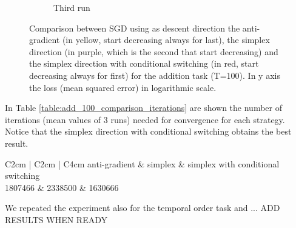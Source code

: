 \begin{figure}
\begin{subfigure}{1.\textwidth}
		\caption{Third run}
		\label{fig:c:comparisong_add_simplex}
	\end{subfigure}%
	\caption{Comparison between SGD using as descent direction the anti-gradient (in yellow, start decreasing always for last), the simplex direction (in purple, which is the second that start decreasing) and the simplex direction with conditional switching (in red, start decreasing always for first) for the addition task (T=100). In y axis the loss (mean squared error) in logarithmic scale.}
	\label{fig:comparisong_add_simplex}
\end{figure}

In Table \ref{table:add_100_comparison_iterations} are shown the number of iterations (mean values of 3 runs) needed for convergence for each strategy. Notice that the simplex direction with conditional switching obtains the best result.
\begin{table}
	\centering
	\begin{tabular}{C{2cm} | C{2cm} | C{4cm}}
		anti-gradient & simplex & simplex with conditional switching \\
		1807466 & 2338500 & 1630666 \\
	\end{tabular}
	\caption{Number of iterations until convergence for the addition task (T=100). Mean of 3 runs.}
	\label{table:add_100_comparison_iterations}
\end{table}

We repeated the experiment also for the temporal order task and ... ADD RESULTS WHEN READY